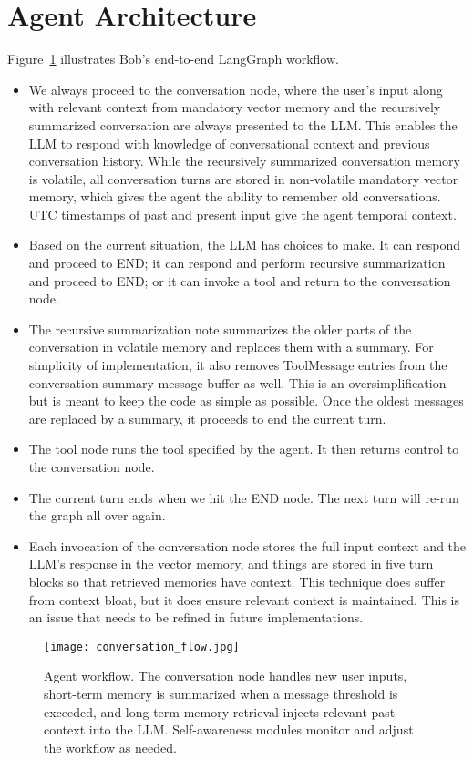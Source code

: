 \documentclass[conference]{IEEEtran}
\begin{document}
\section{Agent Architecture}
Figure~\ref{fig:workflow} illustrates Bob's end-to-end LangGraph workflow.
\begin{itemize}[leftmargin=*]
  \item We always proceed to the conversation node, where the user's input along with relevant context from mandatory vector memory and the recursively summarized conversation are always presented to the LLM.  This enables the LLM to respond with knowledge of conversational context and previous conversation history.  While the recursively summarized conversation memory is volatile, all conversation turns are stored in non-volatile mandatory vector memory, which gives the agent the ability to remember old conversations.  UTC timestamps of past and present input give the agent temporal context.
  \item Based on the current situation, the LLM has choices to make.  It can respond and proceed to END; it can respond and perform recursive summarization and proceed to END; or it can invoke a tool and return to the conversation node.
  \item The recursive summarization note summarizes the older parts of the conversation in volatile memory and replaces them with a summary.  For simplicity of implementation, it also removes ToolMessage entries from the conversation summary message buffer as well.  This is an oversimplification but is meant to keep the code as simple as possible.  Once the oldest messages are replaced by a summary, it proceeds to end the current turn.
  \item The tool node runs the tool specified by the agent.  It then returns control to the conversation node.
  \item The current turn ends when we hit the END node.  The next turn will re-run the graph all over again.
  \item Each invocation of the conversation node stores the full input context and the LLM's response in the vector memory, and things are stored in five turn blocks so that retrieved memories have context.  This technique does suffer from context bloat, but it does ensure relevant context is maintained.  This is an issue that needs to be refined in future implementations.
\end{itemize}

\begin{figure}[H]
  \centering
  \texttt{[image: conversation\_flow.jpg]}
  \caption{Agent workflow. The conversation node handles new user 
  inputs, short-term memory is summarized when a message threshold 
  is exceeded, and long-term memory retrieval injects relevant 
  past context into the LLM. Self-awareness modules monitor and 
  adjust the workflow as needed.}
  \label{fig:workflow}
\end{figure}
\end{document}
